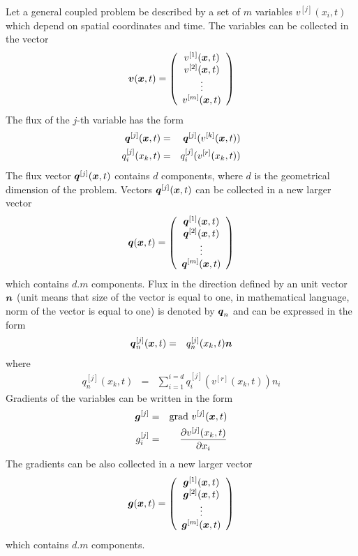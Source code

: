 Let a general coupled problem be described by a set of $m$ variables $v^{[j]}(x_i,t)$
which depend on spatial coordinates and time. The variables can be collected in the vector
\begin{eqnarray}
\mbox{\boldmath$v$}(\mbox{\boldmath$x$},t) = \left(\begin{array}{c}
v^{[1]}(\mbox{\boldmath$x$},t)
\\
v^{[2]}(\mbox{\boldmath$x$},t)
\\
\vdots
\\
v^{[m]}(\mbox{\boldmath$x$},t)
\end{array}\right)
\end{eqnarray}
The flux of the $j$-th variable has the form
\begin{eqnarray}
\mbox{\boldmath$q$}^{[j]}(\mbox{\boldmath$x$},t) &=& \mbox{\boldmath$q$}^{[j]}(v^{[k]}(\mbox{\boldmath$x$},t))
\\
q^{[j]}_i(x_k,t) &=& q^{[j]}_i(v^{[r]}(x_k,t))
\end{eqnarray}
The flux vector $\mbox{\boldmath$q$}^{[j]}(\mbox{\boldmath$x$},t)$ contains $d$ components, where $d$ is the geometrical dimension
of the problem. Vectors $\mbox{\boldmath$q$}^{[j]}(\mbox{\boldmath$x$},t)$ can be collected in a new larger vector
\begin{eqnarray}
\mbox{\boldmath$q$}(\mbox{\boldmath$x$},t) = \left(\begin{array}{c}
\mbox{\boldmath$q$}^{[1]}(\mbox{\boldmath$x$},t)
\\
\mbox{\boldmath$q$}^{[2]}(\mbox{\boldmath$x$},t)
\\
\vdots
\\
\mbox{\boldmath$q$}^{[m]}(\mbox{\boldmath$x$},t)
\end{array}\right)
\end{eqnarray}
which contains $d.m$ components.
Flux in the direction defined by an unit vector $\mbox{\boldmath$n$}$ (unit means that size of the vector is equal
to one, in mathematical language, norm of the vector is equal to one) is denoted by $\mbox{\boldmath$q$}_n$ and
can be expressed in the form
\begin{eqnarray}\label{eqnormalfluxdef}
\mbox{\boldmath$q$}^{[j]}_n(\mbox{\boldmath$x$},t) &=& q^{[j]}_n(x_k,t) \mbox{\boldmath$n$}
\end{eqnarray}
where
\begin{eqnarray}
q^{[j]}_n(x_k,t) &=& \sum_{i=1}^{i=d} q^{[j]}_i(v^{[r]}(x_k,t)) n_i
\end{eqnarray}
Gradients of the variables can be written in the form
\begin{eqnarray}
\mbox{\boldmath$g$}^{[j]} &=& {\rm grad}\ v^{[j]}(\mbox{\boldmath$x$},t)
\\
g^{[j]}_i &=& \mbox{$\displaystyle\frac{\partial{v^{[j]}(x_k,t)}}{\partial{x_i}}$}
\end{eqnarray}
The gradients can be also collected in a new larger vector
\begin{eqnarray}
\mbox{\boldmath$g$}(\mbox{\boldmath$x$},t) = \left(\begin{array}{c}
\mbox{\boldmath$g$}^{[1]}(\mbox{\boldmath$x$},t)
\\
\mbox{\boldmath$g$}^{[2]}(\mbox{\boldmath$x$},t)
\\
\vdots
\\
\mbox{\boldmath$g$}^{[m]}(\mbox{\boldmath$x$},t)
\end{array}\right)
\end{eqnarray}
which contains $d.m$ components.

